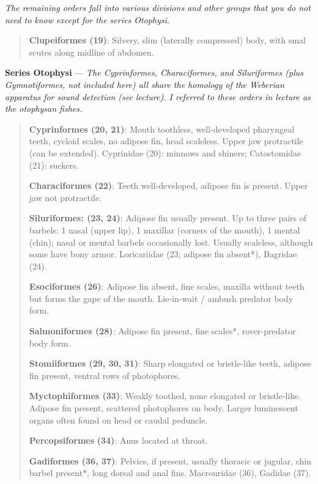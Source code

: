\documentclass[12pt, hidelinks]{exam}
\begin{document}
\textit{The remaining orders fall into various divisions and other groups that you do not need to know except for the series Otophysi.}

\begin{quote}
\textbf{Clupeiformes (19)}: Silvery, slim (laterally compressed) body,
with smal scutes along midline of abdomen.
\end{quote}

\textbf{Series Otophysi} — \textit{The Cyprinformes, Characiformes, and Siluriformes (plus Gymnotiformes, not included here) all share the homology of the Weberian apparatus for sound detection (see lecture). I referred to these orders in lecture as the otophysan fishes.  }

\begin{quote}
\textbf{Cyprinformes (20, 21)}: Mouth toothless, well-developed
pharyngeal teeth, cycloid scales, no adipose fin, head scaleless. Upper
jaw protractile (can be extended). Cyprinidae (20): minnows and shiners;
Catostomidae (21): suckers.

\textbf{Characiformes (22)}: Teeth well-developed, adipose fin is
present. Upper jaw not protractile.

\textbf{Siluriformes: (23, 24)}: Adipose fin usually present. Up to
three pairs of barbels: 1 nasal (upper lip), 1 maxillar (corners of the
mouth), 1 mental (chin); nasal or mental barbels occasionally lost.
Usually scaleless, although some have bony armor. Loricariidae (23;
adipose fin absent*), Bagridae (24).

\textbf{Esociformes (26)}: Adipose fin absent, fine scales, maxilla
without teeth but forms the gape of the mouth. Lie-in-wait / ambush
predator body form.

\textbf{Salmoniformes (28)}: Adipose fin present, fine scales*,
rover-predator body form.

\textbf{Stomiiformes (29, 30, 31)}: Sharp elongated or bristle-like
teeth, adipose fin present, ventral rows of photophores.

\textbf{Myctophiformes (33)}: Weakly toothed, none elongated or
bristle-like. Adipose fin present, scattered photophores on body. Larger
luminescent organs often found on head or caudal peduncle.

\textbf{Percopsiformes} \textbf{(34)}: Anus located at throat.

\textbf{Gadiformes (36, 37)}: Pelvics, if present, usually thoracic or
jugular, chin barbel present*, long dorsal and anal fins. Macrouridae
(36), Gadidae (37).


\end{quote}
\end{document}
